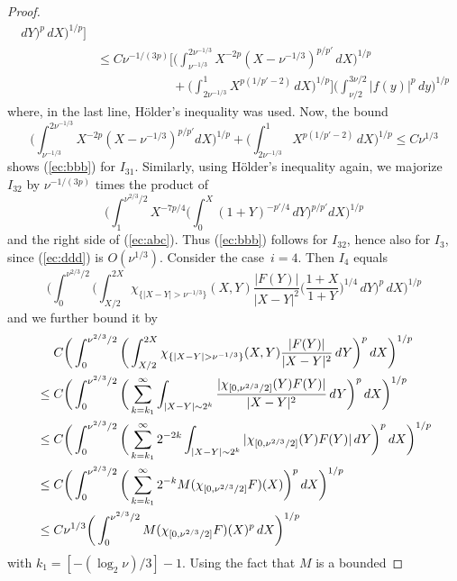 \documentclass[leqno,a4paper]{amsart}
\begin{document}
\begin{proof}
\begin{align*}
\,dY\bigg)^p\,dX\bigg)^{1/p}\bigg]\\
&\le C\nu^{-1/(3p)}\bigg[\bigg(\int_{\nu^{-1/3}}^{2\nu^{-1/3}}X^{-2p}
(X-\nu^{-1/3})^{p/p'}\,dX\bigg)^{1/p}\\
&\qquad \qquad \qquad
+\bigg(\int_{2\nu^{-1/3}}^{1}X^{p(1/p'-2)}\,dX\bigg)^{1/p}\bigg]
\bigg(\int_{\nu/2}^{3\nu/2}|f(y)|^p\,dy\bigg)^{1/p}
\end{align*}
where, in the last line, H\"older's inequality was used. Now, the bound
\begin{equation*}
\bigg(\int_{\nu^{-1/3}}^{2\nu^{-1/3}}X^{-2p}(X-\nu^{-1/3})^{p/p'}dX\bigg)^{1/p} +
\bigg(\int_{2\nu^{-1/3}}^{1}X^{p(1/p'-2)}\,dX\bigg)^{1/p}\le C \nu^{1/3}
\end{equation*}
shows (\ref{ec:bbb}) for $I_{31}$. Similarly, using H\"older's inequality
again, we majorize $I_{32}$ by $\nu^{-1/(3p)}$ times the product of
\begin{equation}
\label{ec:ddd}
\bigg(\int_{1}^{\nu^{2/3}/2}X^{-7p/4}
\bigg(\int_{0}^{X}(1+Y)^{-p'/4}\,dY\bigg)^{p/p'}dX\bigg)^{1/p}
\end{equation}
and the right side of (\ref{ec:abc}).
Thus (\ref{ec:bbb}) follows for $I_{32}$, hence also for $I_3$, since
(\ref{ec:ddd}) is $O(\nu^{1/3})$.
Consider the case~$i=4$. Then $I_4$ equals
\begin{equation*}
\bigg(\int_{0}^{\nu^{2/3}/2}\bigg(\int_{X/2}^{2X}
\chi_{\{|X-Y|>\nu^{-1/3}\}}(X,Y)\frac{|F(Y)|}{|X-Y|^2}
\bigg(\frac{1+X}{1+Y}\bigg)^{1/4}\,dY\bigg)^p\,dX\bigg)^{1/p}
\end{equation*}
and we further bound it by
\begin{align*}
&\phantom{\null\le\null}
C\bigg(\int_{0}^{\nu^{2/3}/2}\bigg(\int_{X/2}^{2X}\chi_{\{|X-Y|>\nu^
{-1/3}\}}(X,Y)\frac{|F(Y)|}{|X-Y|^2}\,dY\bigg)^p\,dX\bigg)^{1/p}\\
&\le C\bigg(\int_{0}^{\nu^{2/3}/2}\bigg( \sum_{k=k_1}^{\infty}\int_{|X-Y|
\sim 2^k}\frac{|\chi_{[0,\nu^{2/3}/2]}(Y)F(Y)|}{|X-Y|^2}\,dY\bigg)^p\,dX\bigg)^{1/p}\\
&\le C \bigg(\int_{0}^{\nu^{2/3}/2}\bigg(\sum_{k=k_1}^{\infty}2^{-2k}\int_{|X-Y|
\sim 2^k} |\chi_{[0,\nu^{2/3}/2]}(Y)F(Y)|\,dY\bigg)^p\,dX\bigg)^{1/p}\\
&\le C \bigg(\int_{0}^{\nu^{2/3}/2}\bigg(\sum_{k=k_1}^{\infty}2^{-k}
M(\chi_{[0,\nu^{2/3}/2]}F)(X)\bigg)^p \,dX\bigg)^{1/p}\\
&\le C\nu^{1/3}\bigg(\int_{0}^{\nu^{2/3}/2}M(\chi_{[0,\nu^{2/3}/2]}F)
(X)^p\,dX\bigg)^{1/p}
\end{align*}
with $k_1 = [-(\log_2\nu)/3]-1$. Using the fact that $M$ is a bounded

\end{proof}
\end{document}
